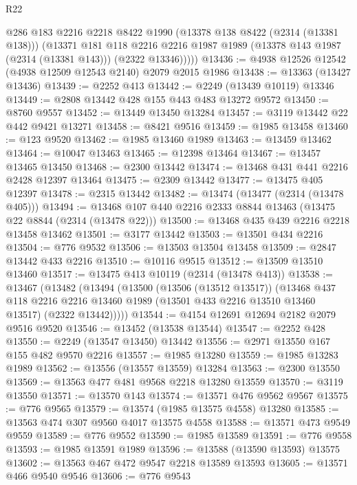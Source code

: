 \begin{lexlean}{R22}
\begin{coremodule}
          @286
          @183
          @2216
          @2218
          @8422
          @1990
          (@13378 @138 @8422 (@2314 (@13381 @138)))
          (@13371
            @181
            @118
            @2216
            @2216
            @1987
            @1989
            (@13378 @143 @1987 (@2314 (@13381 @143)))
            (@2322 @13346)))))
@13436 := @4938 @12526 @12542 (@4938 @12509 @12543 @2140) @2079 @2015 @1986
@13438 := @13363 (@13427 @13436)
@13439 := @2252 @413
@13442 := @2249 (@13439 @10119) @13346
@13449 := @2808 @13442 @428 @155 @443 @483 @13272 @9572
@13450 := @8760 @9557
@13452 := @13449 @13450 @13284
@13457 := @3119 @13442 @22 @442 @9421 @13271
@13458 := @8421 @9516
@13459 := @1985 @13458
@13460 := @123 @9520
@13462 := @1985 @13460 @1989
@13463 := @13459 @13462
@13464 := @10047 @13463
@13465 := @12398 @13464
@13467 := @13457 @13465 @13450
@13468 := @2300 @13442
@13474 := @13468 @431 @441 @2216 @2428 @12397 @13464
@13475 := @2309 @13442
@13477 := @13475 @405 @12397
@13478 := @2315 @13442
@13482 := @13474 (@13477 (@2314 (@13478 @405)))
@13494 := @13468 @107 @440 @2216 @2333 @8844 @13463 (@13475 @22 @8844 (@2314 (@13478 @22)))
@13500 := @13468 @435 @439 @2216 @2218 @13458 @13462
@13501 := @3177 @13442
@13503 := @13501 @434 @2216
@13504 := @776 @9532
@13506 := @13503 @13504 @13458
@13509 := @2847 @13442 @433 @2216
@13510 := @10116 @9515
@13512 := @13509 @13510 @13460
@13517 := @13475 @413 @10119 (@2314 (@13478 @413))
@13538 := @13467
    (@13482
      (@13494
        (@13500
          (@13506 (@13512 @13517))
          (@13468
            @437
            @118
            @2216
            @2216
            @13460
            @1989
            (@13501 @433 @2216 @13510 @13460 @13517)
            (@2322 @13442)))))
@13544 := @4154 @12691 @12694 @2182 @2079 @9516 @9520
@13546 := @13452 (@13538 @13544)
@13547 := @2252 @428
@13550 := @2249 (@13547 @13450) @13442
@13556 := @2971 @13550 @167 @155 @482 @9570 @2216
@13557 := @1985 @13280
@13559 := @1985 @13283 @1989
@13562 := @13556 (@13557 @13559) @13284
@13563 := @2300 @13550
@13569 := @13563 @477 @481 @9568 @2218 @13280 @13559
@13570 := @3119 @13550
@13571 := @13570 @143
@13574 := @13571 @476 @9562 @9567
@13575 := @776 @9565
@13579 := @13574 (@1985 @13575 @4558) @13280
@13585 := @13563 @474 @307 @9560 @4017 @13575 @4558
@13588 := @13571 @473 @9549 @9559
@13589 := @776 @9552
@13590 := @1985 @13589
@13591 := @776 @9558
@13593 := @1985 @13591 @1989
@13596 := @13588 (@13590 @13593) @13575
@13602 := @13563 @467 @472 @9547 @2218 @13589 @13593
@13605 := @13571 @466 @9540 @9546
@13606 := @776 @9543

\end{coremodule}
\end{lexlean}
